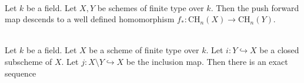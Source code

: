 \documentclass[a4paper]{article}
\begin{document}
\begin{prp}{}{}\\
Let $k$ be a field. Let $X,Y$ be schemes of finite type over $k$. Then the push forward map descends to a well defined homomorphism $f_\ast:\text{CH}_n(X)\to\text{CH}_n(Y)$. 
\end{prp}

\begin{prp}{}{}\\
Let $k$ be a field. Let $X$ be a scheme of finite type over $k$. Let $i:Y\hookrightarrow X$ be a closed subscheme of $X$. Let $j:X\setminus Y\hookrightarrow X$ be the inclusion map. Then there is an exact sequence \\
 \\
\end{prp}
\end{document}

